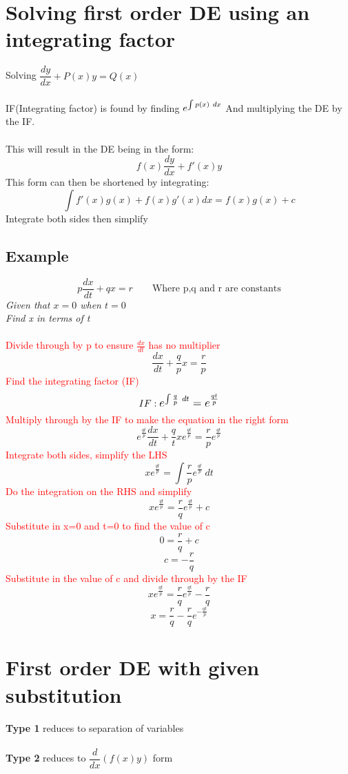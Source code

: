 \documentclass{article}[18pt]
\begin{document}
\section{Solving first order DE using an integrating factor}
Solving $\dfrac{dy}{dx}+P(x)y=Q(x)$\\
\\
IF(Integrating factor) is found by finding $\mathlarger{e^{\int p(x) \ dx}}$ And multiplying the DE by the IF.\\
\\
This will result in the DE being in the form:
$$f(x)\frac{dy}{dx}+f'(x)y$$
This form can then be shortened by integrating:
$$\int f'(x)g(x)+f(x)g'(x) dx=f(x)g(x)+c$$
Integrate both sides then simplify
\subsection{Example}
$$p\frac{dx}{dt}+qx=r \qquad \textrm{Where p,q and r are constants}$$
\textit{Given that $x=0$ when $t=0$}\\
\textit{Find x in terms of t}\\
\\
\textcolor{red}{Divide through by p to ensure $\frac{dx}{dt}$ has no multiplier}
$$\frac{dx}{dt}+\frac{q}{p}x=\frac{r}{p}$$
\textcolor{red}{Find the integrating factor (IF)}
{\Large
$$IF: \mathlarger{e^{\int \frac{q}{p} \ dt}=e^\frac{qt}{p}}$$}
\textcolor{red}{Multiply through by the IF to make the equation in the right form}
{\Large
$$e^\frac{qt}{p}\frac{dx}{dt}+\frac{q}{t}xe^\frac{qt}{p}=\frac{r}{p}e^\frac{qt}{p}$$}
\textcolor{red}{Integrate both sides, simplify the LHS}
{\Large
$$xe^\frac{qt}{p}=\int \frac{r}{p}e^\frac{qt}{p} \ dt$$}
\textcolor{red}{Do the integration on the RHS and simplify}
{\Large
$$xe^\frac{qt}{p}=\frac{r}{q}e^\frac{qt}{p}+c$$}
\textcolor{red}{Substitute in x=0 and t=0 to find the value of c}
$$0=\frac{r}{q}+c$$
$$c=-\frac{r}{q}$$
\textcolor{red}{Substitute in the value of c and divide through by the IF}
{\Large
$$xe^\frac{qt}{p}=\frac{r}{q}e^\frac{qt}{p}-\frac{r}{q}$$
$$x=\frac{r}{q}-\frac{r}{q}e^{-\frac{qt}{p}}$$}
\section{First order DE with given substitution}
\textbf{Type 1} reduces to separation of variables\\
\\
\textbf{Type 2} reduces to $\dfrac{d}{dx}(f(x)y)$ form\\
\end{document}
